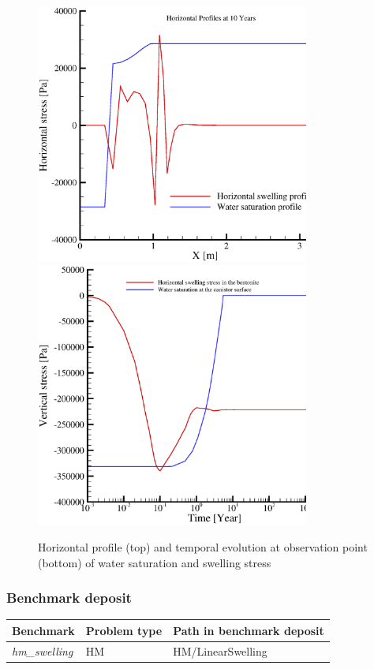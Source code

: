 \begin{figure}[!htb]
\begin{center}
\includegraphics[width=9cm]{HM/HM_unsat/LinearSwellingH.eps}
\includegraphics[width=9cm]{HM/HM_unsat/LinearSwellingTime.eps}
\caption{Horizontal profile (top) and temporal evolution at observation point (bottom) of water saturation and swelling stress}
\label{fig:deco-hm}
\end{center}
\end{figure}

\subsubsection*{Benchmark deposit}
\begin{tabular}{|l|l|l|}
  \hline
  Benchmark & Problem type & Path in benchmark deposit \\
  \hline
 \emph{hm\_swelling}& HM &  HM/LinearSwelling\\
  \hline
\end{tabular}






